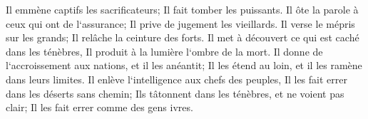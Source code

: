 \verse Il emmène captifs les sacrificateurs; Il fait tomber les puissants. 
\verse Il ôte la parole à ceux qui ont de l`assurance; Il prive de jugement les vieillards. 
\verse Il verse le mépris sur les grands; Il relâche la ceinture des forts. 
\verse Il met à découvert ce qui est caché dans les ténèbres, Il produit à la lumière l`ombre de la mort. 
\verse Il donne de l`accroissement aux nations, et il les anéantit; Il les étend au loin, et il les ramène dans leurs limites. 
\verse Il enlève l`intelligence aux chefs des peuples, Il les fait errer dans les déserts sans chemin; 
\verse Ils tâtonnent dans les ténèbres, et ne voient pas clair; Il les fait errer comme des gens ivres. 

